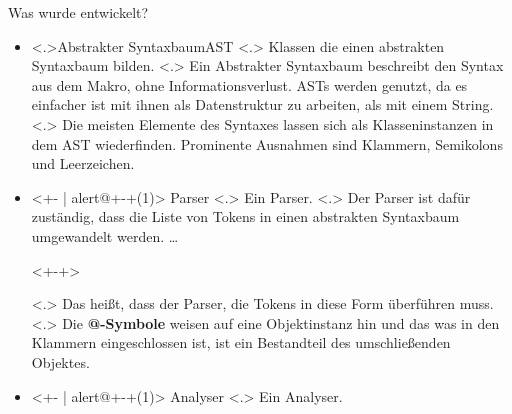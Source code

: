 \begin{frame}{Was wurde entwickelt?}
\begin{itemize}[<+- | alert@+>]
      \item
        \temporal<.>{}{Abstrakter Syntaxbaum}{AST}
            \note[item]<.>{
              Klassen die einen abstrakten Syntaxbaum bilden.
            }
            \note[item]<.>{
              Ein Abstrakter Syntaxbaum beschreibt den Syntax aus dem Makro, ohne  Informationsverlust. ASTs werden genutzt, da es einfacher ist mit ihnen als Datenstruktur zu arbeiten, als mit einem String.
            }
            \note[item]<.>{
              Die meisten Elemente des Syntaxes lassen sich als Klasseninstanzen in dem AST wiederfinden. Prominente Ausnahmen sind Klammern, Semikolons und Leerzeichen.
            }
      \item<+- | alert@+-+(1)>
        Parser%
            \note[item]<.>{
              Ein Parser.
            }
            \note[item]<.>{
              Der Parser ist dafür zuständig, dass die Liste von Tokens in einen abstrakten Syntaxbaum umgewandelt werden.
              \ldots
            }%
        \begin{uncoverenv}<+-+>%
        \end{uncoverenv}%
            \note[item]<.>{
              Das heißt, dass der Parser, die Tokens in diese Form überführen muss.
            }%
            \note[item]<.>{
              Die \textbf{@-Symbole} weisen auf eine Objektinstanz hin und das was in den Klammern eingeschlossen ist, ist ein Bestandteil des umschließenden Objektes.
            }%
      \item<+- | alert@+-+(1)>
        Analyser%
            \note[item]<.>{
              Ein Analyser.
}
\end{itemize}
\end{frame}
